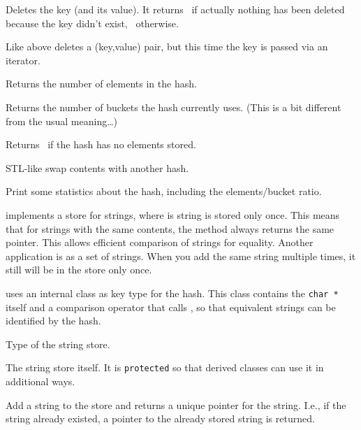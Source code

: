 \documentclass[10pt]{article}
\begin{document}
Deletes the key  (and its value). It returns \false\ if
actually nothing has been deleted because the key didn't exist,
\true\ otherwise.

Like above deletes a (key,value) pair, but this time the key is passed
via an iterator.

Returns the number of elements in the hash.

Returns the number of buckets the hash currently uses. (This is a bit
different from the usual meaning\dots)

Returns \true\ if the hash has no elements stored.

STL-like swap contents with another hash.

Print some statistics about the hash, including the elements/bucket
ratio.




 implements a store for strings, where is string is
stored only once. This means that for strings with the same contents,
the  method always returns the same pointer. This allows
efficient comparison of strings for equality. Another application is
as a set of strings. When you add the same string multiple times, it
still will be in the store only once.

 uses an internal class  as key
type for the hash. This class contains the \texttt{char *} itself and
a comparison operator that calls , so that equivalent
strings can be identified by the hash.

Type of the string store.

The string store itself. It is \texttt{protected} so that derived
classes can use it in additional ways.

Add a string to the store and returns a unique pointer for the string.
I.e., if the string already existed, a pointer to the already stored
string is returned.


\end{document}
